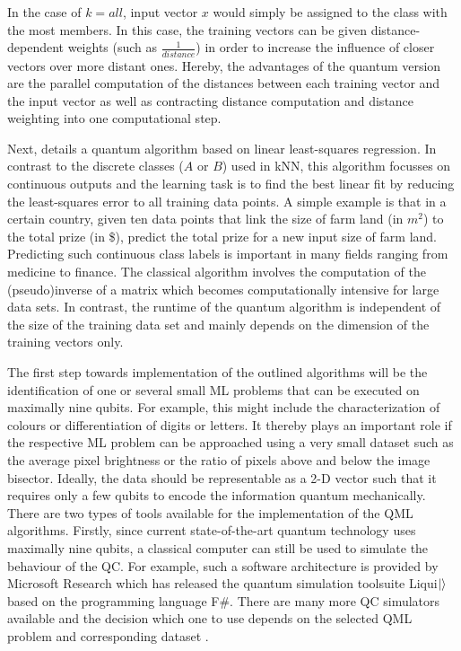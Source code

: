 \documentclass[a4paper]{article}
\newcommand*{\0}{$\ket{0}$}
\newcommand*{\1}{$\ket{1}$}
\begin{document}
In the case of $k = all$, input vector $x$ would simply be assigned to the class with the most members. In this case, the training vectors can be given distance-dependent weights (such as $\frac{1}{distance}$) in order to increase the influence of closer vectors over more distant ones. Hereby, the advantages of the quantum version are the parallel computation of the distances between each training vector and the input vector as well as contracting distance computation and distance weighting into one computational step.

Next, \cite{Schuld2016} details a quantum algorithm based on linear least-squares regression. In contrast to the discrete classes ($A$ or $B$) used in kNN, this algorithm focusses on continuous outputs and the learning task is to find the best linear fit by reducing the least-squares error to all training data points. A simple example is that in a certain country, given ten data points that link the size of farm land (in ${m}^{2}$) to the total prize (in \$), predict the total prize for a new input size of farm land. Predicting such continuous class labels is important in many fields ranging from medicine to finance. The classical algorithm involves the computation of the (pseudo)inverse of a matrix which becomes computationally intensive for large data sets. In contrast, the runtime of the quantum algorithm is independent of the size of the training data set and mainly depends on the dimension of the training vectors only.

The first step towards implementation of the outlined algorithms will be the identification of one or several small ML problems that can be executed on maximally nine qubits. For example, this might include the characterization of colours or differentiation of digits or letters. It thereby plays an important role if the respective ML problem can be approached using a very small dataset such as the average pixel brightness or the ratio of pixels above and below the image bisector. Ideally, the data should be representable as a 2-D vector such that it requires only a few qubits to encode the information quantum mechanically.
\newpage
There are two types of tools available for the implementation of the QML algorithms. Firstly, since current state-of-the-art quantum technology uses maximally nine qubits, a classical computer can still be used to simulate the behaviour of the QC. For example, such a software architecture is provided by Microsoft Research which has released the quantum simulation toolsuite Liqui$\ket{}$ based on the programming language F\#. There are many more QC simulators available and the decision which one to use depends on the selected QML problem and corresponding dataset \citep{quantiki}.
\end{document}
